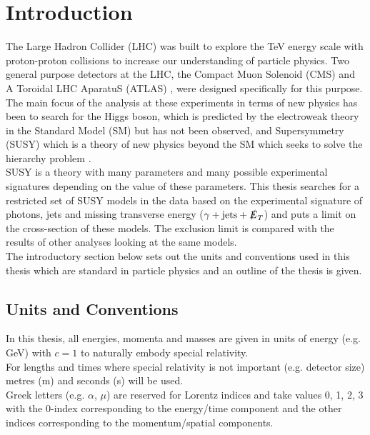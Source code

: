 \chapter{Introduction}

The Large Hadron Collider (LHC) \cite{lhc} was built to explore the TeV energy 
scale with proton-proton collisions to increase our understanding of particle 
physics. Two general purpose detectors at the LHC, the Compact Muon Solenoid 
(CMS) \cite{cms} and A Toroidal LHC AparatuS (ATLAS) \cite{atlas}, were designed 
specifically for this purpose. The main focus of the analysis at these 
experiments in terms of new physics has been to search for the Higgs boson, 
which is predicted by the electroweak theory in the Standard Model (SM)
\cite{higgs} but has not been observed, and Supersymmetry (SUSY) \cite{primer} 
which is a theory of new physics beyond the SM which seeks to solve the 
hierarchy problem \cite{dvali}. \\

SUSY is a theory with many parameters and many possible experimental signatures
depending on the value of these parameters. This thesis searches for a 
restricted set of SUSY models in the data based on the experimental signature of 
photons, jets and missing transverse energy ($\gamma + \mbox{jets} + \slashed{E}_{T}$) and 
puts a limit on the cross-section of these models. The exclusion limit is 
compared with the results of other analyses looking at the same models. \\ 

The introductory section below sets out the units and conventions used in this 
thesis which are standard in particle physics and an outline of the thesis is 
given.

\section{Units and Conventions}

In this thesis, all energies, momenta and masses are given in units of energy 
(e.g. GeV) with $c=1$ to naturally embody special relativity. \\

For lengths and times where special relativity is not important (e.g. detector
size) metres (m) and seconds (s) will be used. \\

Greek letters (e.g. $\alpha$, $\mu$) are reserved for Lorentz indices and take
values 0, 1, 2, 3 with the 0-index corresponding to the energy/time component
and the other indices corresponding to the momentum/spatial components. \\

